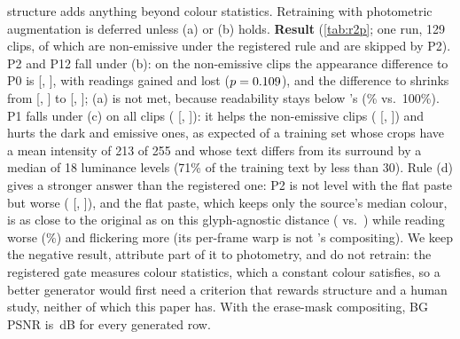 structure adds anything beyond colour statistics. Retraining with photometric augmentation is deferred unless (a) or (b) holds. \textbf{Result} (\cref{tab:r2p}; one run, 129 clips, of which \rpNonem{} are non-emissive under the registered rule and \rpEmis{} are skipped by P2). P2 and P12 fall under (b): on the non-emissive clips the appearance difference to P0 is \rpPTwoNeMean{} [\rpPTwoNeLo, \rpPTwoNeHi], with \rpPTwoNeWins{} readings gained and \rpPTwoNeLosses{} lost ($p=0.109$), and the difference to \method shrinks from \rpPZeroNeVsBMean{} [\rpPZeroNeVsBLo, \rpPZeroNeVsBHi] to \rpPTwoNeVsBMean{} [\rpPTwoNeVsBLo, \rpPTwoNeVsBHi]; (a) is not met, because readability stays below \method's (\rpPTwoNeRead\% vs.\ 100\%). P1 falls under (c) on all clips (\rpPOneAllMean{} [\rpPOneAllLo, \rpPOneAllHi]): it helps the non-emissive clips (\rpPOneNeMean{} [\rpPOneNeLo, \rpPOneNeHi]) and hurts the dark and emissive ones, as expected of a training set whose crops have a mean intensity of 213 of 255 and whose text differs from its surround by a median of 18 luminance levels (71\% of the training text by less than 30). Rule (d) gives a stronger answer than the registered one: P2 is not level with the flat paste but worse (\rpPTwoNeVsFlatMean{} [\rpPTwoNeVsFlatLo, \rpPTwoNeVsFlatHi]), and the flat paste, which keeps only the source's median colour, is as close to the original as \method on this glyph-agnostic distance (\rpFlatAllMad{} vs.\ \rpBoneAllMad) while reading worse (\rpFlatAllRead\%) and flickering more (its per-frame warp is not \method's compositing). We keep the negative result, attribute part of it to photometry, and do not retrain: the registered gate measures colour statistics, which a constant colour satisfies, so a better generator would first need a criterion that rewards structure and a human study, neither of which this paper has. With the erase-mask compositing, BG PSNR is \rpPZeroAllBG\,dB for every generated row.

